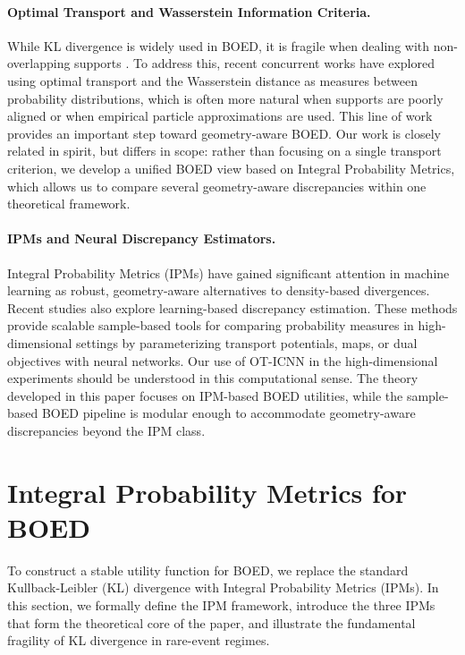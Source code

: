 \documentclass[twoside,11pt]{article}
\begin{document}
\paragraph{Optimal Transport and Wasserstein Information Criteria.}
While KL divergence is widely used in BOED, it is fragile when dealing with non-overlapping supports \citep{arjovsky2017wasserstein}. To address this, recent concurrent works \citep{helin2025bayesian,kerrigan2025geometric} have explored using optimal transport \citep{peyre2019computational,cang2022supervised,wu2025pins} and the Wasserstein distance \citep{villani2009optimal,liu2021wasserstein,song2026wasserstein} as measures between probability distributions, which is often more natural when supports are poorly aligned or when empirical particle approximations are used. This line of work provides an important step toward geometry-aware BOED. Our work is closely related in spirit, but differs in scope: rather than focusing on a single transport criterion, we develop a unified BOED view based on Integral Probability Metrics, which allows us to compare several geometry-aware discrepancies within one theoretical framework.

\paragraph{IPMs and Neural Discrepancy Estimators.}
Integral Probability Metrics (IPMs) \citep{muller1997integral} have gained significant attention in machine learning as robust, geometry-aware alternatives to density-based divergences. Recent studies \citep{amos2017input,korotin2019wasserstein,makkuva2020optimal,birrell2022f} also explore learning-based discrepancy estimation. These methods provide scalable sample-based tools for comparing probability measures in high-dimensional settings by parameterizing transport potentials, maps, or dual objectives with neural networks. Our use of OT-ICNN in the high-dimensional experiments should be understood in this computational sense. The theory developed in this paper focuses on IPM-based BOED utilities, while the sample-based BOED pipeline is modular enough to accommodate geometry-aware discrepancies beyond the IPM class.

\section{Integral Probability Metrics for BOED}
\label{sec:ipms}

To construct a stable utility function for BOED, we replace the standard Kullback-Leibler (KL) divergence with Integral Probability Metrics (IPMs). In this section, we formally define the IPM framework, introduce the three IPMs that form the theoretical core of the paper, and illustrate the fundamental fragility of KL divergence in rare-event regimes.
\end{document}
